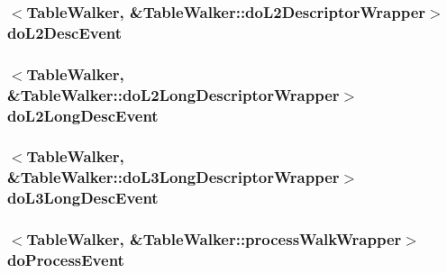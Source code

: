 \label{classArmISA_1_1TableWalker_a5ab01b63bbaded2920f4e72569b63759}
\hypertarget{classArmISA_1_1TableWalker_ad6bd6e623ae7ab7d1cbbe0173e9562f4}{
\subsubsection[{doL2DescEvent}]{$<${\bf TableWalker}, \&TableWalker::doL2DescriptorWrapper$>$ {\bf doL2DescEvent}}}
\label{classArmISA_1_1TableWalker_ad6bd6e623ae7ab7d1cbbe0173e9562f4}
\hypertarget{classArmISA_1_1TableWalker_a987d9ee7304c356462000428178c6c5e}{
\subsubsection[{doL2LongDescEvent}]{$<${\bf TableWalker}, \&TableWalker::doL2LongDescriptorWrapper$>$ {\bf doL2LongDescEvent}}}
\label{classArmISA_1_1TableWalker_a987d9ee7304c356462000428178c6c5e}
\hypertarget{classArmISA_1_1TableWalker_a6a30037030613a33f5a056cd7c9af535}{
\subsubsection[{doL3LongDescEvent}]{$<${\bf TableWalker}, \&TableWalker::doL3LongDescriptorWrapper$>$ {\bf doL3LongDescEvent}}}
\label{classArmISA_1_1TableWalker_a6a30037030613a33f5a056cd7c9af535}
\hypertarget{classArmISA_1_1TableWalker_ac0fab25a73916f1bf677990e67557b5a}{
\subsubsection[{doProcessEvent}]{$<${\bf TableWalker}, \&TableWalker::processWalkWrapper$>$ {\bf doProcessEvent}}}
